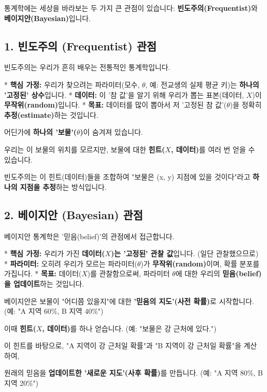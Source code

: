 \documentclass[11pt,a4paper]{book}
\theoremstyle{definition}
\begin{document}
통계학에는 세상을 바라보는 두 가지 큰 관점이 있습니다: \textbf{빈도주의(Frequentist)}와 \textbf{베이지안(Bayesian)}입니다.

\subsection{1. 빈도주의 (Frequentist) 관점}

빈도주의는 우리가 흔히 배우는 전통적인 통계학입니다.

* \textbf{핵심 가정:} 우리가 찾으려는 파라미터(모수, $\theta$, 예: 전교생의 실제 평균 키)는 \textbf{하나의 '고정된' 상수}입니다.
* \textbf{데이터:} 이 '참 값'을 알기 위해 우리가 뽑는 표본(데이터, $X$)이 \textbf{무작위(random)}입니다.
* \textbf{목표:} 데이터를 많이 뽑아서 저 '고정된 참 값'($\theta$)을 정확히 \textbf{추정(estimate)}하는 것입니다.

\begin{examplebox}[title={빈도주의 비유: 고정된 보물 찾기}]
    어딘가에 \textbf{하나의 '보물'($\theta$)}이 숨겨져 있습니다.
    
    우리는 이 보물의 위치를 모르지만, 보물에 대한 \textbf{힌트($X$, 데이터)}를 여러 번 얻을 수 있습니다.
    
    빈도주의는 이 힌트(데이터)들을 조합하여 "보물은 (x, y) 지점에 있을 것이다"라고 \textbf{하나의 지점을 추정}하는 방식입니다.
\end{examplebox}

\subsection{2. 베이지안 (Bayesian) 관점}

베이지안 통계학은 '믿음(belief)'의 관점에서 접근합니다.

* \textbf{핵심 가정:} 우리가 가진 \textbf{데이터($X$)는 '고정된' 관찰 값}입니다. (일단 관찰했으므로)
* \textbf{파라미터:} 오히려 우리가 모르는 파라미터($\theta$)가 \textbf{무작위(random)}이며, 확률 분포를 가집니다.
* \textbf{목표:} 데이터($X$)를 관찰함으로써, 파라미터 $\theta$에 대한 우리의 \textbf{믿음(belief)을 업데이트}하는 것입니다.

\begin{examplebox}[title={베이지안 비유: 확률적인 보물 지도}]
    베이지안은 보물이 "어디쯤 있을지"에 대한 \textbf{'믿음의 지도'(사전 확률)}로 시작합니다.
    (예: "A 지역 60\%, B 지역 40\%")
    
    이때 \textbf{힌트($X$, 데이터)}를 하나 얻습니다. (예: "보물은 강 근처에 있다.")
    
    이 힌트를 바탕으로, "A 지역이 강 근처일 확률"과 "B 지역이 강 근처일 확률"을 계산하여,
    
    원래의 믿음을 \textbf{업데이트한 '새로운 지도'(사후 확률)}를 만듭니다.
    (예: "A 지역 80\%, B 지역 20\%")
\end{examplebox}
\end{document}
